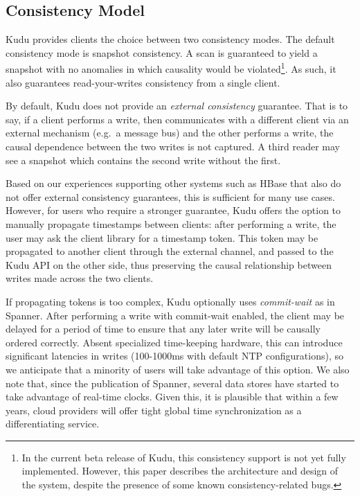 \documentclass{vldb}
\begin{document}
\subsection{Consistency Model}
Kudu provides clients the choice between two consistency modes. The default consistency mode is snapshot
consistency. A scan is guaranteed to yield a snapshot with no anomalies in which causality would be
violated\footnote{In the current beta release of Kudu, this consistency support is not yet fully implemented.
However, this paper describes the architecture and design of the system, despite the presence of
some known consistency-related bugs.}. As such, it also guarantees read-your-writes consistency from a single client.

By default, Kudu does not provide an {\em external consistency} guarantee. That is to say, if a client
performs a write, then communicates with a different client via an external mechanism (e.g.\ a message
bus) and the other performs a write, the causal dependence between the two writes is not captured.
A third reader may see a snapshot which contains the second write without the first.

Based on our experiences supporting other systems such as HBase that also do not offer external consistency
guarantees, this is sufficient for many use cases. However, for users who require a stronger
guarantee, Kudu offers the option to manually propagate timestamps between clients: after performing
a write, the user may ask the client library for a timestamp token. This token may be propagated to
another client through the external channel, and passed to the Kudu API on the other side, thus preserving
the causal relationship between writes made across the two clients.

If propagating tokens is too complex, Kudu optionally uses {\em commit-wait} as in Spanner\cite{spanner}. After
performing a write with commit-wait enabled, the client may be delayed for a period of time to
ensure that any later write will be causally ordered correctly. Absent specialized time-keeping
hardware, this can introduce significant latencies in writes (100-1000ms with default NTP configurations),
so we anticipate that a minority of users will take advantage of this option. We also note
that, since the publication of Spanner, several data stores have started to take advantage
of real-time clocks. Given this, it is plausible that within a few years, cloud providers
will offer tight global time synchronization as a
differentiating service.
\end{document}

